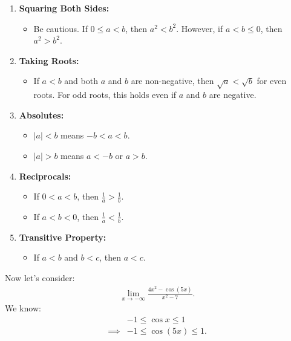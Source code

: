 \documentclass{report}
\begin{document}
\begin{enumerate}
        \item \textbf{Squaring Both Sides:}
        \begin{itemize}
            \item Be cautious. If \(0 \leq a < b\), then \(a^2 < b^2\). However, if \(a < b \leq 0\), then \(a^2 > b^2\).
        \end{itemize}

        \item \textbf{Taking Roots:}
        \begin{itemize}
            \item If \(a < b\) and both \(a\) and \(b\) are non-negative, then \(\sqrt{a} < \sqrt{b}\) for even roots. For odd roots, this holds even if \(a\) and \(b\) are negative.
        \end{itemize}

        \item \textbf{Absolutes:}
        \begin{itemize}
            \item \(|a| < b\) means \( -b < a < b\).
            \item \(|a| > b\) means \(a < -b\) or \(a > b\).
        \end{itemize}

        \item \textbf{Reciprocals:}
        \begin{itemize}
            \item If \(0 < a < b\), then \( \frac{1}{a} > \frac{1}{b} \).
            \item If \(a < b < 0\), then \( \frac{1}{a} < \frac{1}{b} \).
        \end{itemize}

        \item \textbf{Transitive Property:}
        \begin{itemize}
            \item If \(a < b\) and \(b < c\), then \(a < c\).
        \end{itemize}
    \end{enumerate}
      \bigbreak \noindent  \bigbreak \noindent 
      Now let's consider:
      \begin{align*}
        \lim\limits_{x \to -\infty}{\frac{4x^{2}-\cos{(5x)}}{x^{2}-7}}
      .\end{align*}
      \bigbreak \noindent 
      We know:
      \begin{align*}
        &-1 \leq \cos{x} \leq 1 \\
        \implies &-1 \leq\cos{(5x)} \leq 1
      .\end{align*}
\end{document}
